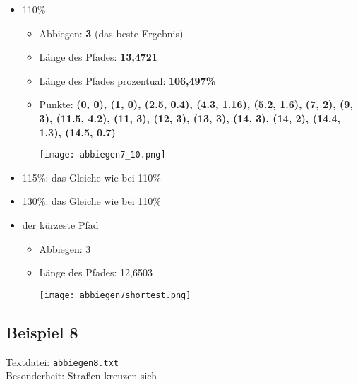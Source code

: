 \documentclass[a4paper,10pt,ngerman]{scrartcl}
\begin{document}
\begin{itemize}
  \item 110\%    
    \begin{itemize}
      \item Abbiegen: \textbf{3} (das beste Ergebnis)
      \item Länge des Pfades: \textbf{13,4721}
      \item Länge des Pfades prozentual: \textbf{106,497\%}
      \item Punkte: \textbf{(0, 0), (1, 0), (2.5, 0.4), (4.3, 1.16), (5.2, 1.6), (7, 2), (9, 3), (11.5, 4.2), (11, 3), (12, 3), (13, 3), (14, 3), (14, 2), (14.4, 1.3), (14.5, 0.7)}
\begin{center}
\texttt{[image: abbiegen7\_10.png]}
\end{center}
  \end{itemize}
  \item 115\%: das Gleiche wie bei 110\%
  \item 130\%: das Gleiche wie bei 110\%
  \item der kürzeste Pfad   
    \begin{itemize}
      \item Abbiegen: 3
      \item Länge des Pfades: 12,6503
\begin{center}
\texttt{[image: abbiegen7shortest.png]}
\end{center}
    \end{itemize}
\end{itemize}

\subsection{Beispiel 8}\label{kreuzen}
Textdatei: \texttt{abbiegen8.txt}\\
Besonderheit: Straßen kreuzen sich
\end{document}

